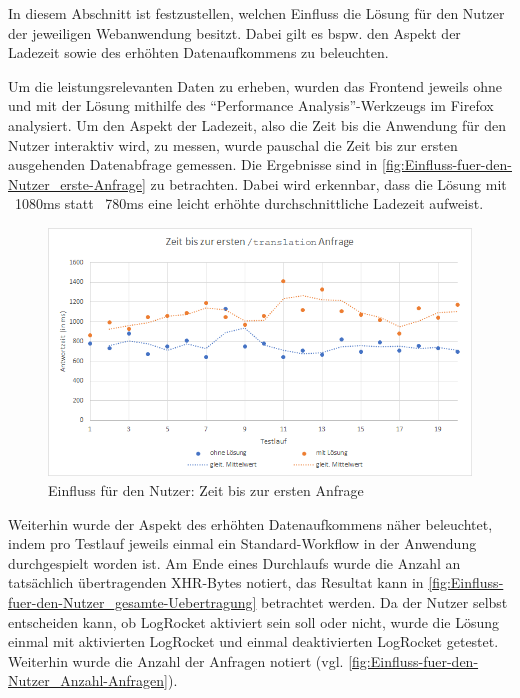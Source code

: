
In diesem Abschnitt ist festzustellen, welchen Einfluss die Lösung für den Nutzer der jeweiligen Webanwendung besitzt. Dabei gilt es bspw. den Aspekt der Ladezeit sowie des erhöhten Datenaufkommens zu beleuchten.

Um die leistungsrelevanten Daten zu erheben, wurden das Frontend jeweils ohne und mit der Lösung mithilfe des \enquote{Performance Analysis}-Werkzeugs im Firefox \cite{FirefoxPerformanceAnalysis} analysiert. Um den Aspekt der Ladezeit, also die Zeit bis die Anwendung für den Nutzer interaktiv wird, zu messen, wurde pauschal die Zeit bis zur ersten ausgehenden Datenabfrage gemessen. Die Ergebnisse sind in \autoref{fig:Einfluss-fuer-den-Nutzer_erste-Anfrage} zu betrachten. Dabei wird erkennbar, dass die Lösung mit ~1080ms statt ~780ms eine leicht erhöhte durchschnittliche Ladezeit aufweist.

\begin{figure}[H]
	\centering
	\includegraphics[width=1.00\linewidth]{data/Einfluss-fuer-den-Nutzer/Einfluss-fuer-den-Nutzer_erste-Anfrage.png}
	\caption{Einfluss für den Nutzer: Zeit bis zur ersten Anfrage}
	\label{fig:Einfluss-fuer-den-Nutzer_erste-Anfrage}
\end{figure}

Weiterhin wurde der Aspekt des erhöhten Datenaufkommens näher beleuchtet, indem pro Testlauf jeweils einmal ein Standard-Workflow in der Anwendung durchgespielt worden ist. Am Ende eines Durchlaufs wurde die Anzahl an tatsächlich\footnotemark{} übertragenden XHR-Bytes notiert, das Resultat kann in  \autoref{fig:Einfluss-fuer-den-Nutzer_gesamte-Uebertragung} betrachtet werden. Da der Nutzer selbst entscheiden kann, ob LogRocket aktiviert sein soll oder nicht, wurde die Lösung einmal mit aktivierten LogRocket und einmal deaktivierten LogRocket getestet. Weiterhin wurde die Anzahl der Anfragen notiert (vgl. \autoref{fig:Einfluss-fuer-den-Nutzer_Anzahl-Anfragen}).

